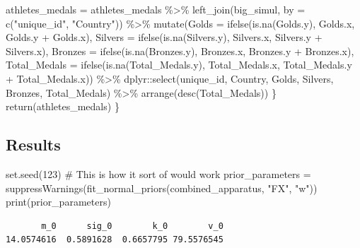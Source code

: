 \documentclass[
  letterpaper,
  DIV=11,
  numbers=noendperiod]{scrartcl}
\newenvironment{Shaded}{\begin{snugshade}}{\end{snugshade}}
\newcommand{\AttributeTok}[1]{\textcolor[rgb]{0.40,0.45,0.13}{#1}}
\newcommand{\CommentTok}[1]{\textcolor[rgb]{0.37,0.37,0.37}{#1}}
\newcommand{\DecValTok}[1]{\textcolor[rgb]{0.68,0.00,0.00}{#1}}
\newcommand{\FunctionTok}[1]{\textcolor[rgb]{0.28,0.35,0.67}{#1}}
\newcommand{\NormalTok}[1]{\textcolor[rgb]{0.00,0.23,0.31}{#1}}
\newcommand{\OtherTok}[1]{\textcolor[rgb]{0.00,0.23,0.31}{#1}}
\newcommand{\SpecialCharTok}[1]{\textcolor[rgb]{0.37,0.37,0.37}{#1}}
\newcommand{\StringTok}[1]{\textcolor[rgb]{0.13,0.47,0.30}{#1}}
\begin{document}
\begin{Shaded}
\begin{Highlighting}[]
\NormalTok{    athletes\_medals }\OtherTok{=}\NormalTok{ athletes\_medals }\SpecialCharTok{\%\textgreater{}\%}
      \FunctionTok{left\_join}\NormalTok{(big\_simul, }\AttributeTok{by =} \FunctionTok{c}\NormalTok{(}\StringTok{"unique\_id"}\NormalTok{, }\StringTok{"Country"}\NormalTok{)) }\SpecialCharTok{\%\textgreater{}\%}
      \FunctionTok{mutate}\NormalTok{(}\AttributeTok{Golds =} \FunctionTok{ifelse}\NormalTok{(}\FunctionTok{is.na}\NormalTok{(Golds.y), Golds.x, Golds.y }\SpecialCharTok{+}\NormalTok{ Golds.x),}
             \AttributeTok{Silvers =} \FunctionTok{ifelse}\NormalTok{(}\FunctionTok{is.na}\NormalTok{(Silvers.y), Silvers.x, Silvers.y }\SpecialCharTok{+}\NormalTok{ Silvers.x),}
             \AttributeTok{Bronzes =} \FunctionTok{ifelse}\NormalTok{(}\FunctionTok{is.na}\NormalTok{(Bronzes.y), Bronzes.x, Bronzes.y }\SpecialCharTok{+}\NormalTok{ Bronzes.x),}
             \AttributeTok{Total\_Medals =} \FunctionTok{ifelse}\NormalTok{(}\FunctionTok{is.na}\NormalTok{(Total\_Medals.y), Total\_Medals.x, Total\_Medals.y }\SpecialCharTok{+}\NormalTok{ Total\_Medals.x)) }\SpecialCharTok{\%\textgreater{}\%}
\NormalTok{      dplyr}\SpecialCharTok{::}\FunctionTok{select}\NormalTok{(unique\_id, Country, Golds, Silvers, Bronzes, Total\_Medals) }\SpecialCharTok{\%\textgreater{}\%}
      \FunctionTok{arrange}\NormalTok{(}\FunctionTok{desc}\NormalTok{(Total\_Medals))}
\NormalTok{  \} }
  \FunctionTok{return}\NormalTok{(athletes\_medals)}
\NormalTok{\}}
\end{Highlighting}
\end{Shaded}

\hypertarget{results}{%
\subsection{Results}\label{results}}

\begin{Shaded}
\begin{Highlighting}[]
\FunctionTok{set.seed}\NormalTok{(}\DecValTok{123}\NormalTok{)}
\CommentTok{\# This is how it sort of would work}
\NormalTok{prior\_parameters }\OtherTok{=} \FunctionTok{suppressWarnings}\NormalTok{(}\FunctionTok{fit\_normal\_priors}\NormalTok{(combined\_apparatus, }\StringTok{"FX"}\NormalTok{, }\StringTok{"w"}\NormalTok{))}
\FunctionTok{print}\NormalTok{(prior\_parameters)}
\end{Highlighting}
\end{Shaded}

\begin{verbatim}
       m_0      sig_0        k_0        v_0 
14.0574616  0.5891628  0.6657795 79.5576545 
\end{verbatim}
\end{document}
